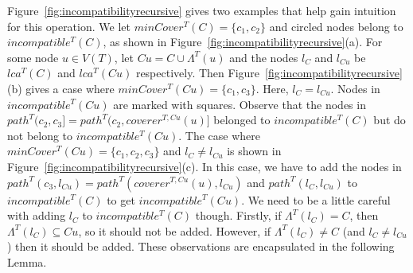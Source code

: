 \documentclass{article}
\newcommand{\leafset}{\Lambda}
\begin{document}
    Figure~\ref{fig:incompatibilityrecursive} gives two examples that help gain intuition for this operation. We let $minCover^{T}(C) = \{c_1, c_2\}$ and circled nodes belong to $incompatible^{T}(C)$, as shown in Figure~\ref{fig:incompatibilityrecursive}(a). For some node $u \in V(T)$, let $Cu = C \cup \leafset^{T}(u)$ and the nodes $l_C$ and $l_{Cu}$ be $lca^{T}(C)$ and $lca^{T}(Cu)$ respectively. Then Figure~\ref{fig:incompatibilityrecursive}(b) gives a case where $minCover^{T}(Cu) = \{c_1, c_3\}$. Here, $l_C = l_{Cu}$. Nodes in $incompatible^{T}(Cu)$ are marked with squares. Observe that the nodes in $path^{T}(c_2, c_3] = path^{T}(c_2, coverer^{T, Cu}(u)]$ belonged to $incompatible^{T}(C)$ but do not belong to $incompatible^{T}(Cu)$. The case where $minCover^{T}(Cu) = \{c_1, c_2, c_3\}$ and $l_C \neq l_{Cu}$ is shown in Figure~\ref{fig:incompatibilityrecursive}(c). In this case, we have to add the nodes in $path^{T}(c_3, l_{Cu}) = path^{T}(coverer^{T, Cu}(u), l_{Cu})$ and $path^{T}(l_C, l_{Cu})$ to $incompatible^{T}(C)$ to get $incompatible^{T}(Cu)$. We need to be a little careful with adding $l_C$ to $incompatible^{T}(C)$ though. Firstly, if $\leafset^{T}(l_C) = C$, then $\leafset^{T}(l_C) \subseteq Cu$, so it should not be added. However, if $\leafset^{T}(l_C) \neq C$ (and $l_C \neq l_{Cu}$) then it should be added. These observations are encapsulated in the following Lemma.
    \newline
\end{document}
